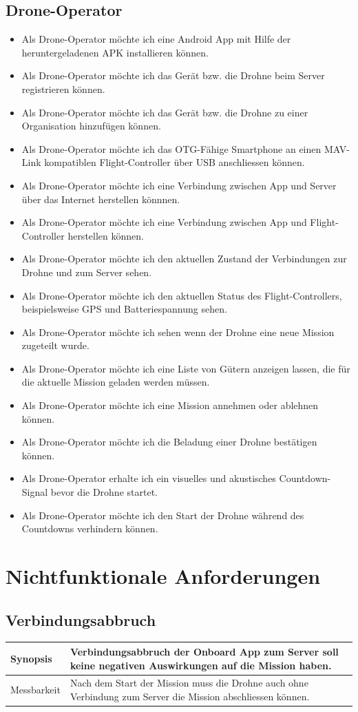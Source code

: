 \subsection{Drone-Operator}
\begin{itemize}
	\item Als Drone-Operator möchte ich eine Android App mit Hilfe der heruntergeladenen APK installieren können.
	\item Als Drone-Operator möchte ich das Gerät bzw. die Drohne beim Server registrieren können.
	\item Als Drone-Operator möchte ich das Gerät bzw. die Drohne zu einer Organisation hinzufügen können.
	\item Als Drone-Operator möchte ich das OTG-Fähige Smartphone an einen MAV-Link kompatiblen Flight-Controller über USB anschliessen können.
	\item Als Drone-Operator möchte ich eine Verbindung zwischen App und Server über das Internet herstellen könnnen.
	\item Als Drone-Operator möchte ich eine Verbindung zwischen App und Flight-Controller herstellen können.
	\item Als Drone-Operator möchte ich den aktuellen Zustand der Verbindungen zur Drohne und zum Server sehen.
	\item Als Drone-Operator möchte ich den aktuellen Status des Flight-Controllers, beispielsweise GPS und Batteriespannung sehen.
	\item Als Drone-Operator möchte ich sehen wenn der Drohne eine neue Mission zugeteilt wurde.
	\item Als Drone-Operator möchte ich eine Liste von Gütern anzeigen lassen, die für die aktuelle Mission geladen werden müssen.
	\item Als Drone-Operator möchte ich eine Mission annehmen oder ablehnen können.
	\item Als Drone-Operator möchte ich die Beladung einer Drohne bestätigen können.
	\item Als Drone-Operator erhalte ich ein visuelles und akustisches Countdown-Signal bevor die Drohne startet.
	\item Als Drone-Operator möchte ich den Start der Drohne während des Countdowns verhindern können.
\end{itemize}
\newpage
\section{Nichtfunktionale Anforderungen}
\subsection{Verbindungsabbruch}
\begin{tabular}{|p{}|p{}|} \hline
	Synopsis & Verbindungsabbruch der Onboard App zum Server soll keine negativen Auswirkungen auf die Mission haben.  \\ \hline
		
	Messbarkeit & Nach dem Start der Mission muss die Drohne auch ohne Verbindung zum Server die Mission abschliessen können. \\ \hline
\end{tabular}

